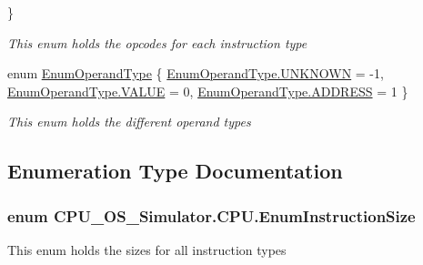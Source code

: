 \begin{DoxyCompactItemize}
 \}\begin{DoxyCompactList}\small\item\em This enum holds the opcodes for each instruction type \end{DoxyCompactList}
\item 
enum \hyperlink{namespace_c_p_u___o_s___simulator_1_1_c_p_u_ad49cfe442b74115a326c03b7ae848f76}{Enum\+Operand\+Type} \{ \hyperlink{namespace_c_p_u___o_s___simulator_1_1_c_p_u_ad49cfe442b74115a326c03b7ae848f76a696b031073e74bf2cb98e5ef201d4aa3}{Enum\+Operand\+Type.\+U\+N\+K\+N\+O\+W\+N} = -\/1, 
\hyperlink{namespace_c_p_u___o_s___simulator_1_1_c_p_u_ad49cfe442b74115a326c03b7ae848f76aecc2e9c313faddb07e7da223c1dc5c3f}{Enum\+Operand\+Type.\+V\+A\+L\+U\+E} = 0, 
\hyperlink{namespace_c_p_u___o_s___simulator_1_1_c_p_u_ad49cfe442b74115a326c03b7ae848f76a2664f03ac6b8bb9eee4287720e407db3}{Enum\+Operand\+Type.\+A\+D\+D\+R\+E\+S\+S} = 1
 \}\begin{DoxyCompactList}\small\item\em This enum holds the different operand types \end{DoxyCompactList}
\end{DoxyCompactItemize}


\subsection{Enumeration Type Documentation}
\hypertarget{namespace_c_p_u___o_s___simulator_1_1_c_p_u_af322082b9b46482202165fb547c052a7}{}
\subsubsection[{Enum\+Instruction\+Size}]{\setlength{\rightskip}{0pt plus 5cm}enum {\bf C\+P\+U\+\_\+\+O\+S\+\_\+\+Simulator.\+C\+P\+U.\+Enum\+Instruction\+Size}\hspace{0.3cm}{\ttfamily [strong]}}\label{namespace_c_p_u___o_s___simulator_1_1_c_p_u_af322082b9b46482202165fb547c052a7}


This enum holds the sizes for all instruction types 

